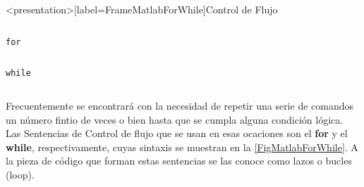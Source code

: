 \begin{frame}<presentation>[label=FrameMatlabForWhile]{Control de Flujo}
  \begin{columns}
    \hfill


  \end{columns}

  \begin{columns}[T]
      \flushright \large\texttt{for}

      \begin{codeblock}
	
      \end{codeblock}

      \begin{codeblock}
	

      \end{codeblock}

  \end{columns}

  \begin{columns}[T]
    \flushright \large\texttt{while}

      \begin{codeblock}
	
      \end{codeblock}

      \begin{codeblock}
	
      \end{codeblock}

  \end{columns}
\end{frame}


Frecuentemente se encontrará con la necesidad de repetir una serie de 
comandos un número fintio de veces o bien hasta que se cumpla alguna 
condición lógica. Las Sentencias de Control de flujo que se usan en esas 
ocaciones son el \textbf{for} y el \textbf{while}, respectivamente, 
cuyas sintaxis se muestran en la \autoref{FigMatlabForWhile}. A la pieza de
código que forman estas sentencias se las conoce como
lazos o bucles (loop).

